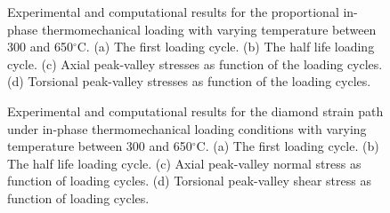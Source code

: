 \begin{figure}[!htp]
\caption{Experimental and computational results for the proportional in-phase thermomechanical loading with varying temperature between 300 and 650$^{\circ}$C. (a) The first loading cycle. (b) The half life loading cycle. (c) Axial peak-valley stresses as function of the loading cycles. (d) Torsional peak-valley stresses as function of the loading cycles.}
\label{Fig:TMF_Prop45}
\end{figure}

\begin{figure}
\caption{Experimental and computational results for the diamond strain path under in-phase thermomechanical loading conditions with varying temperature between  300 and 650$^{\circ}$C. (a) The first loading cycle. (b) The half life loading cycle. (c) Axial peak-valley normal stress as function of loading cycles. (d) Torsional peak-valley shear stress as function of  loading cycles.}
\label{Fig:TMF_Diamond}
\end{figure}


